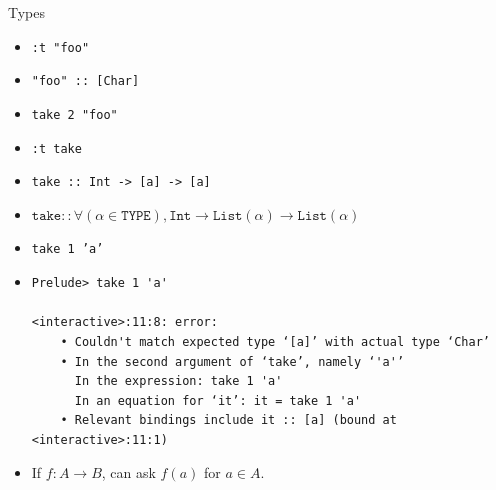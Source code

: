 \documentclass[8pt]{beamer}
\newcommand{\raw}[1]{\texttt{#1}}
\newcommand{\hs}[1]{\texttt{#1}}
\begin{document}
\begin{frame}[fragile]{Types}
\begin{itemize}
\item \raw{:t "foo"} \pause
\item \hs{"foo" :: [Char]}
\item \hs{take 2 "foo"} \pause
\item \raw{:t take}
\item \hs{take :: Int -> [a] -> [a]} \pause
\item $\texttt{take} :: \forall (\alpha \in \texttt{TYPE}), \texttt{Int} \rightarrow \texttt{List}(\alpha) \rightarrow \texttt{List}(\alpha)$\pause
\item \hs{take 1 'a'} \pause
\item
\begin{verbatim}
Prelude> take 1 'a'

<interactive>:11:8: error:
    • Couldn't match expected type ‘[a]’ with actual type ‘Char’
    • In the second argument of ‘take’, namely ‘'a'’
      In the expression: take 1 'a'
      In an equation for ‘it’: it = take 1 'a'
    • Relevant bindings include it :: [a] (bound at <interactive>:11:1)
\end{verbatim}
\pause
\item If $f: A \rightarrow B$, \pause can ask $f(a)$ for $a \in A$.
\end{itemize}
\end{frame}
\end{document}
